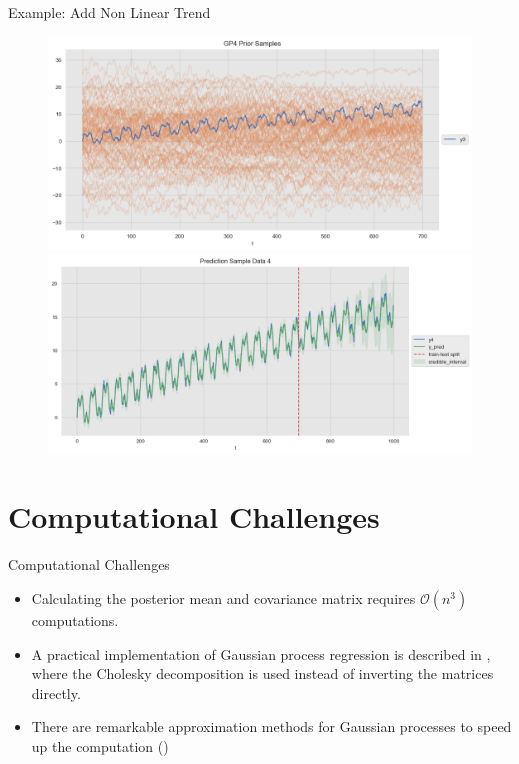 \documentclass[10pt]{beamer}
\begin{document}
\begin{frame}{Example: Add Non Linear Trend}
\begin{center}
\begin{figure}
\includegraphics[scale=0.30]{images/gaussian_process_time_series_files/gaussian_process_time_series_83_0.png}
\includegraphics[scale=0.30]{images/gaussian_process_time_series_files/gaussian_process_time_series_88_0.png}
\end{figure}
\end{center}
\end{frame}

\section{Computational Challenges}

\begin{frame}{Computational Challenges}
\begin{itemize}
\item Calculating the posterior mean and covariance matrix requires $\mathcal{O}(n^3)$ computations. 
\item A practical implementation of Gaussian process regression is described in \cite[Algorithm 2.1]{RW05}, where the Cholesky decomposition is used instead of inverting the matrices directly. 
\item There are remarkable approximation methods for Gaussian processes to speed up the computation (\cite[Chapter 20.1]{BDA13})
\end{itemize}
\end{frame}
\end{document}
